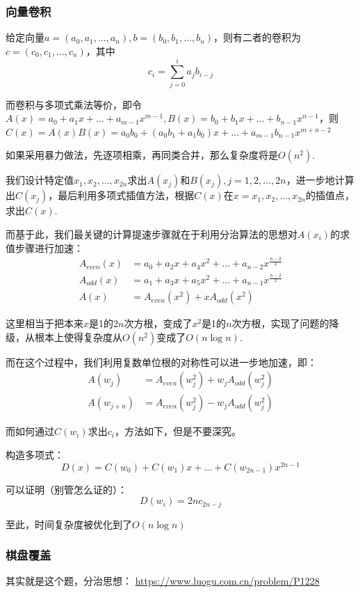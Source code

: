 \documentclass[./../main.tex]{subfiles}
\begin{document}
\subsubsection{向量卷积}
给定向量$a=(a_0,a_1,\dots,a_n), b=(b_0,b_1,\dots,b_n)
$，则有二者的卷积为$c=(c_0,c_1,\dots,c_n)$，其中
\begin{equation*}
    c_i=\sum_{j=0}^i a_j b_{i-j}
\end{equation*}

而卷积与多项式乘法等价，即令$A(x)=a_0+a_1x+\dots+a_{m-1}x^{m-1}, B(x)=b_0+b_1x+\dots+b_{n-1}x^{n-1}$，则
$C(x)=A(x)B(x)=a_0b_0+(a_0b_1+a_1b_0)x+\dots+a_{m-1}b_{n-1}x^{m+n-2}$

如果采用暴力做法，先逐项相乘，再同类合并，那么复杂度将是$O(n^2)$.

我们设计特定值$x_1,x_2,\dots,x_{2n}$求出$A(x_j)$和$B(x_j),j=1,2,\dots,2n$，进一步地计算出$C(x_j)$，最后利用多项式插值方法，根据$C(x)$在$x=x_1,x_2,\dots,x_{2n}$的插值点，求出$C(x)$.

而基于此，我们最关键的计算提速步骤就在于利用分治算法的思想对$A(x_i)$的求值步骤进行加速：
\begin{align*}
    A_{even}(x)&=a_0+a_2x+a_4x^2+\dots+a_{n-2}x^{\frac{n-2}{2}}\\
    A_{odd}(x)&=a_1+a_3x+a_5x^2+\dots+a_{n-1}x^{\frac{n-2}{2}}\\
    A(x)&=A_{even}(x^2)+xA_{odd}(x^2)
\end{align*}

这里相当于把本来$x$是1的$2n$次方根，变成了$x^2$是1的$n$次方根，实现了问题的降级，从根本上使得复杂度从$O(n^2)$变成了$O(n\log n)$.

而在这个过程中，我们利用复数单位根的对称性可以进一步地加速，即：
\begin{align*}
    A(w_j)&=A_{even}(w_j^2)+w_jA_{odd}(w_j^2)\\
    A(w_{j+n})&=A_{even}(w_j^2)-w_jA_{odd}(w_j^2)
\end{align*}

而如何通过$C(w_i)$求出$c_i$，方法如下，但是不要深究。

构造多项式：
\[
    D(x)=C(w_0)+C(w_1)x+\dots+C(w_{2n-1})x^{2n-1}
\]

可以证明（别管怎么证的）：
\[
    D(w_i)=2nc_{2n-j}
\]

至此，时间复杂度被优化到了$O(n\log n)$

\subsubsection{棋盘覆盖}
其实就是这个题，分治思想：
\url{https://www.luogu.com.cn/problem/P1228}
\end{document}
